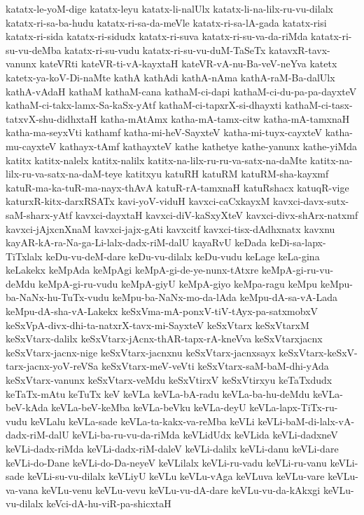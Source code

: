 {katatx-le-yoM-dige
katatx-leyu
katatx-li-nalUlx
katatx-li-na-lilx-ru-vu-dilalx
katatx-ri-sa-ba-hudu
katatx-ri-sa-da-meVle
katatx-ri-sa-lA-gada
katatx-risi
katatx-ri-sida
katatx-ri-sidudx
katatx-ri-suva
katatx-ri-su-va-da-riMda
katatx-ri-su-vu-deMba
katatx-ri-su-vudu
katatx-ri-su-vu-duM-TaSeTx
katavxR-tavx-vanunx
kateVRti
kateVR-ti-vA-kayxtaH
kateVR-vA-nu-Ba-veV-neYva
katetx
katetx-ya-koV-Di-naMte
kathA
kathAdi
kathA-nAma
kathA-raM-Ba-dalUlx
kathA-vAdaH
kathaM
kathaM-cana
kathaM-ci-dapi
kathaM-ci-du-pa-pa-dayxteV
kathaM-ci-takx-lamx-Sa-kaSx-yAtf
kathaM-ci-tapxrX-si-dhayxti
kathaM-ci-tasx-tatxvX-shu-didhxtaH
katha-mAtAmx
katha-mA-tamx-citw
katha-mA-tamxnaH
katha-ma-seyxVti
kathamf
katha-mi-heV-SayxteV
katha-mi-tuyx-cayxteV
katha-mu-cayxteV
kathayx-tAmf
kathayxteV
kathe
kathetye
kathe-yanunx
kathe-yiMda
katitx
katitx-nalelx
katitx-nalilx
katitx-na-lilx-ru-ru-va-satx-na-daMte
katitx-na-lilx-ru-va-satx-na-daM-teye
katitxyu
katuRH
katuRM
katuRM-sha-kayxmf
katuR-ma-ka-tuR-ma-nayx-thAvA
katuR-rA-tamxnaH
katuRshacx
katuqR-vige
katurxR-kitx-darxRSATx
kavi-yoV-viduH
kavxci-caCxkayxM
kavxci-davx-sutx-saM-sharx-yAtf
kavxci-dayxtaH
kavxci-diV-kaSxyXteV
kavxci-divx-shArx-natxmf
kavxci-jAjxcnXnaM
kavxci-jajx-gAti
kavxcitf
kavxci-tisx-dAdhxnatx
kavxnu
kayAR-kA-ra-Na-ga-Li-lalx-dadx-riM-dalU
kayaRvU
keDada
keDi-sa-lapx-TiTxlalx
keDu-vu-deM-dare
keDu-vu-dilalx
keDu-vudu
keLage
keLa-gina
keLakekx
keMpAda
keMpAgi
keMpA-gi-de-ye-nunx-tAtxre
keMpA-gi-ru-vu-deMdu
keMpA-gi-ru-vudu
keMpA-giyU
keMpA-giyo
keMpa-ragu
keMpu
keMpu-ba-NaNx-hu-TuTx-vudu
keMpu-ba-NaNx-mo-da-lAda
keMpu-dA-sa-vA-Lada
keMpu-dA-sha-vA-Lakekx
keSxVma-mA-ponxV-tiV-tAyx-pa-satxmobxV
keSxVpA-divx-dhi-ta-natxrX-tavx-mi-SayxteV
keSxVtarx
keSxVtarxM
keSxVtarx-dalilx
keSxVtarx-jAcnx-thAR-tapx-rA-kneVva
keSxVtarxjacnx
keSxVtarx-jacnx-nige
keSxVtarx-jacnxnu
keSxVtarx-jacnxsayx
keSxVtarx-keSxV-tarx-jacnx-yoV-reVSa
keSxVtarx-meV-veVti
keSxVtarx-saM-baM-dhi-yAda
keSxVtarx-vanunx
keSxVtarx-veMdu
keSxVtirxV
keSxVtirxyu
keTaTxdudx
keTaTx-mAtu
keTuTx
keV
keVLa
keVLa-bA-radu
keVLa-ba-hu-deMdu
keVLa-beV-kAda
keVLa-beV-keMba
keVLa-beVku
keVLa-deyU
keVLa-lapx-TiTx-ru-vudu
keVLalu
keVLa-sade
keVLa-ta-kakx-va-reMba
keVLi
keVLi-baM-di-lalx-vA-dadx-riM-dalU
keVLi-ba-ru-vu-da-riMda
keVLidUdx
keVLida
keVLi-dadxneV
keVLi-dadx-riMda
keVLi-dadx-riM-daleV
keVLi-dalilx
keVLi-danu
keVLi-dare
keVLi-do-Dane
keVLi-do-Da-neyeV
keVLilalx
keVLi-ru-vadu
keVLi-ru-vanu
keVLi-sade
keVLi-su-vu-dilalx
keVLiyU
keVLu
keVLu-vAga
keVLuva
keVLu-vare
keVLu-va-vana
keVLu-venu
keVLu-vevu
keVLu-vu-dA-dare
keVLu-vu-da-kAkxgi
keVLu-vu-dilalx
keVci-dA-hu-viR-pa-shicxtaH
}
